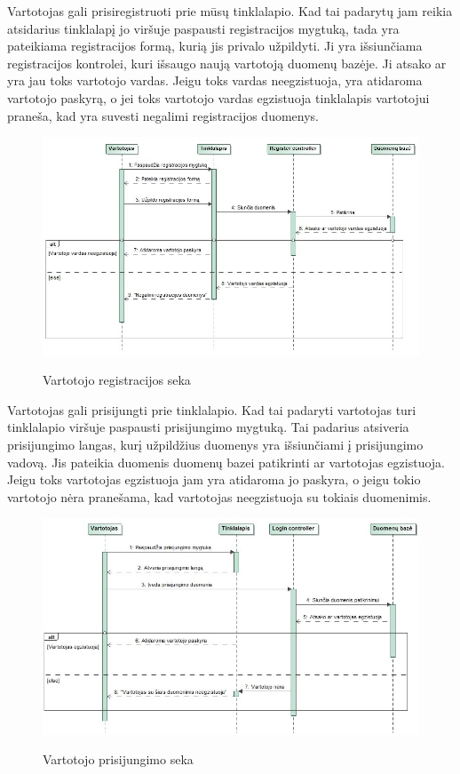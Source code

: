 ﻿\documentclass{VUMIFPSkursinis}
\begin{document}
Vartotojas gali prisiregistruoti prie mūsų tinklalapio. Kad tai padarytų jam reikia atsidarius tinklalapį jo viršuje paspausti registracijos mygtuką, tada yra pateikiama registracijos formą, kurią jis privalo užpildyti. Ji yra išsiunčiama registracijos kontrolei, kuri išsaugo naują vartotoją duomenų bazėje. Ji atsako ar yra jau toks vartotojo vardas.  Jeigu toks vardas neegzistuoja, yra atidaroma vartotojo paskyrą, o jei toks vartotojo vardas egzistuoja tinklalapis vartotojui praneša, kad yra suvesti negalimi registracijos duomenys.

\begin{figure}[H]
    \centering
    \includegraphics[scale=0.45]{img/Pav/VartotojoRegistracija}
    \label{img:uml2}
	\caption{Vartotojo registracijos seka}
\end{figure}

Vartotojas gali prisijungti prie tinklalapio. Kad tai padaryti vartotojas turi tinklalapio viršuje paspausti prisijungimo mygtuką. Tai padarius atsiveria prisijungimo langas, kurį užpildžius duomenys yra išsiunčiami į prisijungimo vadovą. Jis pateikia duomenis duomenų bazei patikrinti ar vartotojas egzistuoja. Jeigu toks vartotojas egzistuoja jam yra atidaroma jo paskyra, o jeigu tokio vartotojo nėra pranešama, kad vartotojas neegzistuoja su tokiais duomenimis.

\begin{figure}[H]
    \centering
    \includegraphics[scale=0.45]{img/Pav/VartotojoPrisijungimas}
    \label{img:uml3}
	\caption{Vartotojo prisijungimo seka}
\end{figure}
\end{document}
